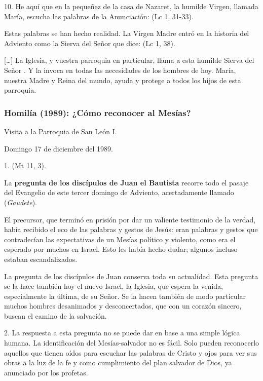 \begin{body}
\begin{body}
10.  He aquí que en la pequeñez de la casa de Nazaret, la humilde Virgen, llamada María, escucha las palabras de la Anunciación:  (Lc 1, 31-33).

Estas palabras se han hecho realidad. La Virgen Madre entró en la historia del Adviento como la Sierva del Señor que dice:  (Lc 1, 38).

{[}\ldots{}{]} La Iglesia, y vuestra parroquia en particular, llama a esta humilde Sierva del Señor . Y la invoca en todas las necesidades de los hombres de hoy. María, nuestra Madre y Reina del mundo, ayuda y protege a todos los hijos de esta parroquia.

\subsubsection{Homilía (1989): ¿Cómo reconocer al Mesías?}

Visita a la Parroquia de San León I.

Domingo 17 de diciembre del 1989.

1.  (Mt 11, 3).

La \textbf{pregunta de los discípulos de Juan el Bautista} recorre todo el pasaje del Evangelio de este tercer domingo de Adviento, acertadamente llamado  (\emph{Gaudete}).

El precursor, que terminó en prisión por dar un valiente testimonio de la verdad, había recibido el eco de las palabras y gestos de Jesús: eran palabras y gestos que contradecían las expectativas de un Mesías político y violento, como era el esperado por muchos en Israel. Esto les había hecho dudar; algunos incluso estaban escandalizados.

 La pregunta de los discípulos de Juan conserva toda su actualidad. Esta pregunta se la hace también hoy el nuevo Israel, la Iglesia, que espera la venida, especialmente la última, de su Señor. Se la hacen también de modo particular muchos hombres desanimados y desconcertados, que con un corazón sincero, buscan el camino de la salvación.

2. La respuesta a esta pregunta no se puede dar en base a una simple lógica humana. La identificación del Mesías-salvador no es fácil. Solo pueden reconocerlo aquellos que tienen oídos para escuchar las palabras de Cristo y ojos para ver sus obras a la luz de la fe y como cumplimiento del plan salvador de Dios, ya anunciado por los profetas.


\end{body}
\end{body}
